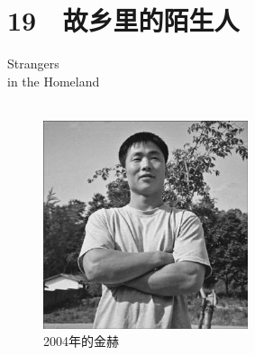\fancyhead[RO]{{\tiny{\textcolor{Gray}{\FA \ }}}\thepage}
\fancyhead[LE]{{\tiny{\textcolor{Gray}{\FA \ }}}\thepage}
\fancyfoot[LE,RO]{}
\fancyfoot[LO,CE]{}
\fancyfoot[CO,RE]{}
\chapter*{19 {\FA } 故乡里的陌生人}
\begin{flushright}
	\textcolor{PinYinColor}{\EN \huge{Strangers\\
	in the Homeland\\
	\ \\}}
\end{flushright}

\begin{figure}[!htbp]
\centering
\includegraphics[width=6cm]{./Chapters/Images/19.jpg}
\caption*{2004年的金赫}
\end{figure}

